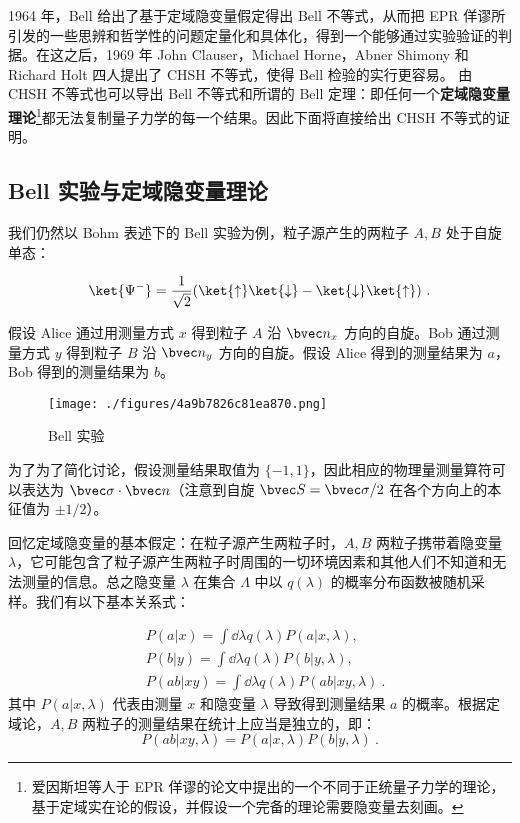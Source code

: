 

1964 年，Bell 给出了基于定域隐变量假定得出 Bell 不等式，从而把 EPR 佯谬所引发的一些思辨和哲学性的问题定量化和具体化，得到一个能够通过实验验证的判据。在这之后，1969 年 John Clauser，Michael Horne，Abner Shimony 和 Richard Holt 四人提出了 CHSH 不等式，使得 Bell 检验的实行更容易。 由 CHSH 不等式也可以导出 Bell 不等式和所谓的 Bell 定理：即任何一个\textbf{定域隐变量理论}\footnote{爱因斯坦等人于 EPR 佯谬的论文中提出的一个不同于正统量子力学的理论，基于定域实在论的假设，并假设一个完备的理论需要隐变量去刻画。}都无法复制量子力学的每一个结果。因此下面将直接给出 CHSH 不等式的证明。

\subsection{Bell 实验与定域隐变量理论}
我们仍然以 Bohm 表述下的 Bell 实验为例，粒子源产生的两粒子 $A,B$ 处于自旋单态：

\begin{equation}
\ket{\Psi^-}=\frac{1}{\sqrt{2}}(\ket{\uparrow}\ket{\downarrow}-\ket{\downarrow}\ket{\uparrow})~.
\end{equation}

假设 Alice 通过用测量方式 $x$ 得到粒子 $A$ 沿 $\bvec n_x$ 方向的自旋。Bob 通过测量方式 $y$ 得到粒子 $B$ 沿 $\bvec n_y$ 方向的自旋。假设 Alice 得到的测量结果为 $a$，Bob 得到的测量结果为 $b$。

\begin{figure}[ht]
\centering
\texttt{[image: ./figures/4a9b7826c81ea870.png]}
\caption{Bell 实验} \label{fig_chsh_1}
\end{figure}

为了为了简化讨论，假设测量结果取值为 $\{-1,1\}$，因此相应的物理量测量算符可以表达为 $\bvec \sigma \cdot \bvec n$（注意到自旋 $\bvec S=\bvec \sigma/2$ 在各个方向上的本征值为 $\pm 1/2$）。

回忆定域隐变量的基本假定：在粒子源产生两粒子时，$A,B$ 两粒子携带着隐变量 $\lambda$，它可能包含了粒子源产生两粒子时周围的一切环境因素和其他人们不知道和无法测量的信息。总之隐变量 $\lambda$ 在集合 $\Lambda$ 中以 $q(\lambda)$ 的概率分布函数被随机采样。我们有以下基本关系式：

\begin{equation}
\begin{aligned}
&P(a|x)=\int \dd \lambda q(\lambda)P(a|x,\lambda),\\
&P(b|y)=\int \dd \lambda q(\lambda)P(b|y,\lambda),\\
&P(ab|xy)=\int \dd \lambda q(\lambda)P(ab|xy,\lambda)~.
\end{aligned}
\end{equation}
其中 $P(a|x,\lambda)$ 代表由测量 $x$ 和隐变量 $\lambda$ 导致得到测量结果 $a$ 的概率。根据定域论，$A,B$ 两粒子的测量结果在统计上应当是独立的，即：
\begin{equation}
P(ab|xy,\lambda)=P(a|x,\lambda)P(b|y,\lambda)~.
\end{equation}
